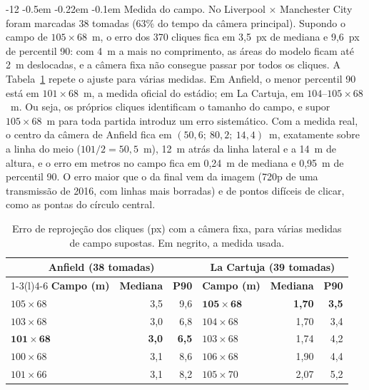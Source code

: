 \documentclass[12pt]{article}
\makeatletter
\renewcommand\paragraph{\@startsection{paragraph}{4}{\z@}%
                       {-12\p@ \@plus -4\p@ \@minus -4\p@}%
                       {-0.5em \@plus -0.22em \@minus -0.1em}%
                       {\normalfont\normalsize\itshape}}
\makeatother
\begin{document}
\paragraph{Medida do campo.} No Liverpool $\times$ Manchester City foram marcadas 38
tomadas (63\% do tempo da câmera principal). Supondo o campo de $105\times68$~m, o
erro dos 370 cliques fica em 3,5~px de mediana e 9,6~px de percentil 90: com 4~m a
mais no comprimento, as áreas do modelo ficam até 2~m deslocadas, e a câmera fixa
não consegue passar por todos os cliques. A Tabela~\ref{tab:campo} repete o ajuste
para várias medidas. Em Anfield, o menor percentil 90 está em $101\times68$~m, a
medida oficial do estádio; em La Cartuja, em $104$--$105\times68$~m. Ou seja, os
próprios cliques identificam o tamanho do campo, e supor $105\times68$~m para toda
partida introduz um erro sistemático. Com a medida real, o centro da câmera de
Anfield fica em $(50{,}6;\ 80{,}2;\ 14{,}4)$~m, exatamente sobre a linha do meio
($101/2 = 50{,}5$~m), 12~m atrás da linha lateral e a 14~m de altura, e o erro em
metros no campo fica em 0,24~m de mediana e 0,95~m de percentil 90. O erro maior que o
da final vem da imagem (720p de uma transmissão de 2016, com linhas mais borradas)
e de pontos difíceis de clicar, como as pontas do círculo central.

\begin{table}[H]
\centering
\caption{Erro de reprojeção dos cliques (px) com a câmera fixa, para várias medidas
de campo supostas. Em negrito, a medida usada.}
\label{tab:campo}
\begin{tabular}{@{}lrrlrr@{}}
\toprule
\multicolumn{3}{c}{\textbf{Anfield (38 tomadas)}} & \multicolumn{3}{c}{\textbf{La Cartuja (39 tomadas)}} \\
\cmidrule(r){1-3}\cmidrule(l){4-6}
\textbf{Campo (m)} & \textbf{Mediana} & \textbf{P90} & \textbf{Campo (m)} & \textbf{Mediana} & \textbf{P90} \\
\midrule
$105\times68$ & 3,5 & 9,6 & $\mathbf{105\times68}$ & \textbf{1,70} & \textbf{3,5} \\
$103\times68$ & 3,0 & 6,8 & $104\times68$ & 1,70 & 3,4 \\
$\mathbf{101\times68}$ & \textbf{3,0} & \textbf{6,5} & $103\times68$ & 1,74 & 4,2 \\
$100\times68$ & 3,1 & 8,6 & $106\times68$ & 1,90 & 4,4 \\
$101\times66$ & 3,1 & 8,2 & $105\times70$ & 2,07 & 5,2 \\
\bottomrule
\end{tabular}
\end{table}
\end{document}
